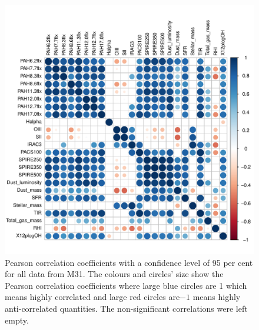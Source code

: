       \begin{figure}
                \centering
                \includegraphics[width=\textwidth]{../images0.01/cor_plots/M31_all_derived_ones_core_plot_for_paper.pdf}
            \caption{Pearson correlation coefficients with a confidence level of 95 per cent for all data from M31. The colours and circles' size show the Pearson correlation coefficients where large blue circles are 1 which means highly correlated and large red circles are$-1$ means highly anti-correlated quantities. The non-significant correlations were left empty.}
            \label{fig: cor_all}
        \end{figure}
 
